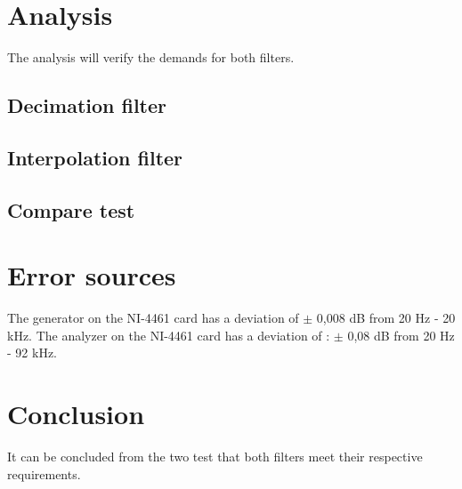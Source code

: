 \section{Analysis}
The analysis will verify the demands for both filters.

\subsection*{Decimation filter}


\subsection*{Interpolation filter}

\subsection*{Compare test}


\section{Error sources}
The generator on the NI-4461 card has a deviation of $\pm$ 0,008 dB from 20 Hz - 20 kHz. The analyzer on the NI-4461 card has a deviation of : $\pm$ 0,08 dB from 20 Hz - 92 kHz. 

\section{Conclusion}
It can be concluded from the two test that both filters meet their respective requirements.